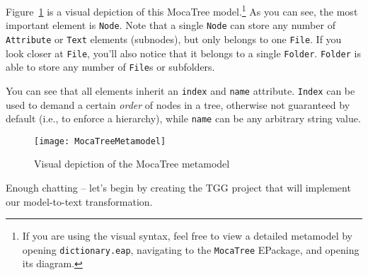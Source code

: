 Figure~\ref{mocaTreeMetamodel} is a visual depiction of this MocaTree model.\footnote{If you are using the visual syntax, feel free to view a detailed metamodel
by opening \texttt{dictionary.eap}, navigating to the \texttt{MocaTree} EPackage, and opening its diagram.} As you can see, the most important element is
\texttt{Node}. Note that a single \texttt{Node} can store any number of \texttt{Attribute} or \texttt{Text} elements (subnodes), but only belongs to one
\texttt{File}. If you look closer at \texttt{File}, you'll also notice that it belongs to a single \texttt{Folder}. \texttt{Folder} is able to store any number
of \texttt{File}s or subfolders.

\newpage

You can see that all elements inherit an \texttt{index} and \texttt{name} attribute. \texttt{Index} can be used to demand a certain \emph{order}
of nodes in a tree, otherwise not guaranteed by default (i.e., to enforce a hierarchy), while \texttt{name} can be any arbitrary string value. 

\vspace{1cm}

\begin{figure}[htbp]
  \begin{centering}
  \texttt{[image: MocaTreeMetamodel]}
  \caption{Visual depiction of the MocaTree metamodel}
  \label{mocaTreeMetamodel}
  \end{centering}
\end{figure}

\vspace{1cm}

Enough chatting -- let's begin by creating the TGG project that will implement our model-to-text transformation.


\newpage






